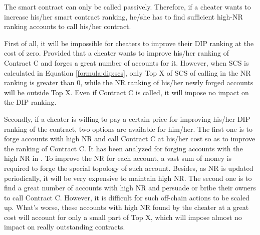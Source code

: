 The smart contract can only be called passively. Therefore, if a cheater wants to increase his/her smart contract ranking, he/she has to find sufficient high-NR ranking accounts to call his/her contract.


First of all, it will be impossible for cheaters to improve their DIP ranking at the cost of zero. Provided that a cheater wants to improve his/her ranking of Contract C and forges a great number of accounts for it. However, when SCS is calculated in Equation \ref{formula:dip:scs}, only Top X of SCS of calling in the NR ranking is greater than 0, while the NR ranking of his/her newly forged accounts will be outside Top X. Even if Contract C is called, it will impose no impact on the DIP ranking.


Secondly, if a cheater is willing to pay a certain price for improving his/her DIP ranking of the contract, two options are available for him/her. The first one is to forge accounts with high NR and call Contract C at his/her cost so as to improve the ranking of Contract C. It has been analyzed for forging accounts with the high NR in . To improve the NR for each account, a vast sum of money is required to forge the special topology of such account. Besides, as NR is updated periodically, it will be very expensive to maintain high NR. The second one is to find a great number of accounts with high NR and persuade or bribe their owners to call Contract C. However, it is difficult for such off-chain actions to be scaled up. What's worse, these accounts with high NR found by the cheater at a great cost will account for only a small part of Top X, which will impose almost no impact on really outstanding contracts.


